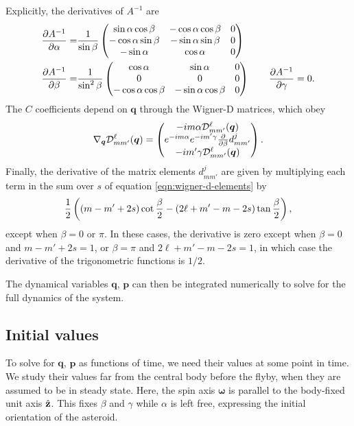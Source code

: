 \documentclass[11pt]{article}
\begin{document}
Explicitly, the derivatives of $A^{-1}$ are
\begin{equation}
\begin{aligned}
\frac{\partial A^{-1}}{\partial \alpha} = & \frac{1}{\sin \beta}\left( \begin{matrix}
\sin \alpha \cos \beta & -\cos \alpha \cos \beta & 0\\
-\cos \alpha \sin \beta & -\sin \alpha \sin \beta & 0 \\
-\sin \alpha & \cos \alpha & 0\\
\end{matrix} \right)\\
\frac{\partial A^{-1}}{\partial \beta} = & \frac{1}{\sin^2\beta}\left( \begin{matrix}
\cos \alpha & \sin \alpha & 0\\
0 & 0 & 0\\
-\cos\alpha \cos\beta & -\sin \alpha \cos \beta & 0\\
\end{matrix} \right)\qquad
\frac{\partial A^{-1}}{\partial \gamma} = 0.
\end{aligned}
\end{equation}
The $C$ coefficients depend on $\bm q$ through the Wigner-D matrices, which obey
\begin{equation}
\nabla_{\bm q}\mathcal{D}^\ell_{m m'}(\bm q) = \left( \begin{matrix}
-im\alpha \mathcal{D}^\ell_{m m'}(\bm q)\\
e^{-im\alpha} e^{-im'\gamma}\frac{\partial}{\partial \beta} d^j_{mm'}\\
-im'\gamma \mathcal{D}^\ell_{m m'}(\bm q)\\
\end{matrix} \right).
\label{eqn:wigner-d-derivatives}
\end{equation}
Finally, the derivative of the matrix elements $d^j_{mm'}$ are given by multiplying each term in the sum over $s$ of equation \ref{eqn:wigner-d-elements} by
$$\frac{1}{2}\left( (m-m'+2s) \cot \frac{\beta}{2} - (2\ell + m' - m - 2s) \tan \frac{\beta}{2} \right),$$
except when $\beta = 0$ or $\pi$. In these cases, the derivative is zero except when $\beta=0$ and $m-m'+2s=1$, or $\beta = \pi$ and $2 \ell + m' - m - 2s=1$, in which case the derivative of the trigonometric functions is $1/2$.


The dynamical variables $\bm q$, $\bm p$ can then be integrated numerically to solve for the full dynamics of the system.

\subsection{Initial values}
To solve for $\bm q$, $\bm p$ as functions of time, we need their values at some point in time. We study their values far from the central body before the flyby, when they are assumed to be in steady state. Here, the spin axis $\bm \omega$ is parallel to the body-fixed unit axis $\hat{\mathbf{z}}$. This fixes $\beta$ and $\gamma$ while $\alpha$ is left free, expressing the initial orientation of the asteroid.
\end{document}
